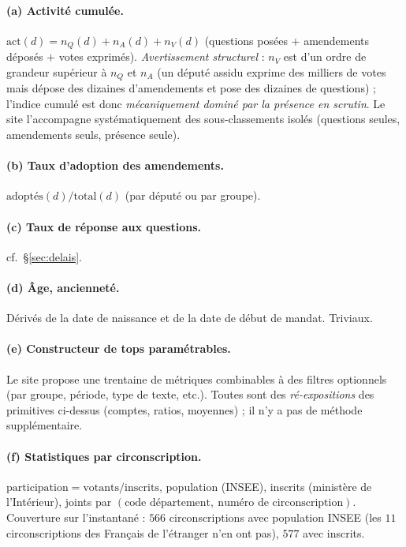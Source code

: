 \documentclass[11pt,a4paper]{article}
\begin{document}
\paragraph{(a) Activité cumulée.} $\mathrm{act}(d)=n_Q(d)+n_A(d)+n_V(d)$ (questions
posées $+$ amendements déposés $+$ votes exprimés). \emph{Avertissement structurel} :
$n_V$ est d'un ordre de grandeur supérieur à $n_Q$ et $n_A$ (un député assidu
exprime des milliers de votes mais dépose des dizaines d'amendements et pose des
dizaines de questions) ; l'indice cumulé est donc \emph{mécaniquement dominé par la
présence en scrutin}. Le site l'accompagne systématiquement des sous-classements
isolés (questions seules, amendements seuls, présence seule).

\paragraph{(b) Taux d'adoption des amendements.} $\text{adoptés}(d)/\mathrm{total}(d)$
(par député ou par groupe).

\paragraph{(c) Taux de réponse aux questions.} cf.~§\ref{sec:delais}.

\paragraph{(d) Âge, ancienneté.} Dérivés de la date de naissance et de la date de
début de mandat. Triviaux.

\paragraph{(e) Constructeur de tops paramétrables.} Le site propose une trentaine
de \og{}métriques\fg{} combinables à des filtres optionnels (par groupe, période,
type de texte, etc.). Toutes sont des \emph{ré-expositions} des primitives
ci-dessus (comptes, ratios, moyennes) ; il n'y a pas de méthode supplémentaire.

\paragraph{(f) Statistiques par circonscription.} $\mathrm{participation}=\mathrm{votants}/\mathrm{inscrits}$,
population (INSEE), inscrits (ministère de l'Intérieur), joints par
$(\text{code département},\ \text{numéro de circonscription})$. Couverture sur
l'instantané : $566$ circonscriptions avec population INSEE (les $11$
circonscriptions des Français de l'étranger n'en ont pas), $577$ avec inscrits.
\end{document}
